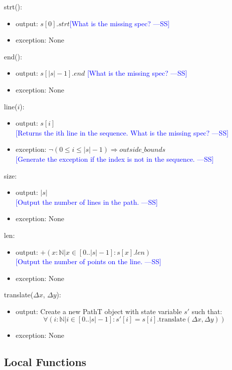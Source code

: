 \documentclass[12pt]{article}
\newcommand{\authornote}[3]{\textcolor{#1}{[#3 ---#2]}}
\newcommand{\authornote}[3]{}
\newcommand{\wss}[1]{\authornote{blue}{SS}{#1}}
\begin{document}
\noindent strt():
\begin{itemize}
\item output: $s[0].strt$\wss{What is the missing spec?}
\item exception: None
\end{itemize}

\noindent end():
\begin{itemize}
\item output: $s[|s| -1].end$ \wss{What is the missing spec?}
\item exception: None
\end{itemize}

\noindent line($i$):
\begin{itemize}
\item output: $s[i]$ \\%
\wss{Returns the ith line in the sequence.  What is the missing spec?}
\item exception: $\lnot(0 \leq i \leq |s| - 1) \Rightarrow outside\_bounds$\\\wss{Generate the exception if the index is not in the sequence.}
\end{itemize}

\noindent size:
\begin{itemize}
\item output: $|s|$ \\ \wss{Output the number of lines in the path.}
\item exception: None
\end{itemize}

\noindent len:
\begin{itemize}
\item output: $+(x : \mathbb{N} | x \in [0 .. |s|-1]: s[x].len)$ \\ \wss{Output the number of points on the line.}
\item exception: None
\end{itemize}

\noindent translate($\Delta x$, $\Delta y$):
\begin{itemize}
\item output: Create a new PathT object with state variable $s'$ such that:
$$\forall(i: \mathbb{N} | i \in [0..|s|-1] : s'[i] = s[i].\mbox{translate}(\Delta x, \Delta y))$$
\item exception: None
\end{itemize}

\subsection*{Local Functions}
\end{document}
